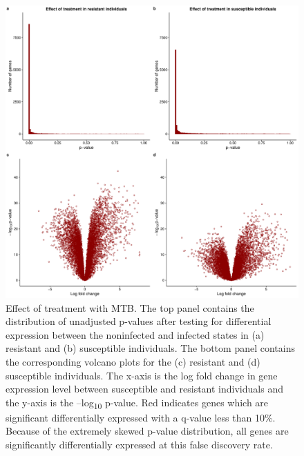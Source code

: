 \documentclass[fleqn,10pt]{wlscirep}
\begin{document}
\begin{figure}[ht]
\centering
\includegraphics[width=\linewidth]{../figure/limma-supp.pdf}
\caption{
Effect of treatment with MTB. The top panel contains the distribution
of unadjusted p-values after testing for differential expression
between the noninfected and infected states in (a) resistant and (b)
susceptible individuals. The bottom panel contains the corresponding
volcano plots for the (c) resistant and (d) susceptible individuals.
The x-axis is the log fold change in gene expression level between
susceptible and resistant individuals and the y-axis is the
–log\textsubscript{10} p-value. Red indicates genes which are
significant differentially expressed with a q-value less than 10\%.
Because of the extremely skewed p-value distribution, all genes are
significantly differentially expressed at this false discovery rate.
}
\label{fig:limma-supp}
\end{figure}
\end{document}
